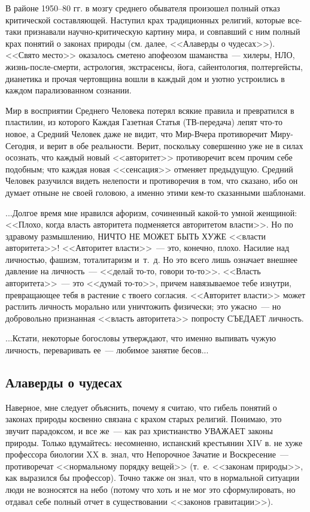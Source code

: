 \documentclass{scrbook}
\newcommand{\flqq}{<<}
\newcommand{\frqq}{>>}
\newcommand{\mdash}{~--- }
\newcommand{\ndash}{--}
\newcommand{\essaysection}[1]{\subsection*{#1}\nopagebreak}
\begin{document}
В районе 1950{\ndash}80 гг. в мозгу среднего обывателя произошел полный отказ критической составляющей. Наступил крах традиционных религий, которые все-таки признавали научно-критическую картину мира, и совпавший с ним полный крах понятий о законах природы (см. далее, {\flqq}Алаверды о чудесах{\frqq}). {\flqq}Свято место{\frqq} оказалось сметено апофеозом шаманства{\mdash}хилеры, НЛО, жизнь-после-смерти, астрология, экстрасенсы, йога, сайентология, полтергейсты, дианетика и прочая чертовщина вошли в каждый дом и уютно устроились в каждом парализованном сознании.

Мир в восприятии Среднего Человека потерял всякие правила и превратился в пластилин, из которого Каждая Газетная Статья (ТВ-передача) лепят что-то новое, а Средний Человек даже не видит, что Мир-Вчера противоречит Миру-Сегодня, и верит в обе реальности. Верит, поскольку совершенно уже не в силах осознать, что каждый новый {\flqq}авторитет{\frqq} противоречит всем прочим себе подобным; что каждая новая {\flqq}сенсация{\frqq} отменяет предыдущую. Средний Человек разучился видеть нелепости и противоречия в том, что сказано, ибо он думает отныне не своей головою, а именно этими кем-то сказанными шаблонами.

...Долгое время мне нравился афоризм, сочиненный какой-то умной женщиной: {\flqq}Плохо, когда власть авторитета подменяется авторитетом власти{\frqq}. Но по здравому размышлению, НИЧТО НЕ МОЖЕТ БЫТЬ ХУЖЕ {\flqq}власти авторитета{\frqq}! {\flqq}Авторитет власти{\frqq}{\mdash}это, конечно, плохо. Насилие над личностью, фашизм, тоталитаризм и~т.~д. Но это всего лишь означает внешнее давление на личность{\mdash}{\flqq}делай то-то, говори то-то{\frqq}. {\flqq}Власть авторитета{\frqq}{\mdash}это {\flqq}думай то-то{\frqq}, причем навязываемое тебе изнутри, превращающее тебя в растение с твоего согласия. {\flqq}Авторитет власти{\frqq} может растлить личность морально или уничтожить физически; это ужасно{\mdash}но добровольно признанная {\flqq}власть авторитета{\frqq} попросту СЪЕДАЕТ личность.

...Кстати, некоторые богословы утверждают, что именно выпивать чужую личность, переваривать ее{\mdash}любимое занятие бесов...

\essaysection{Алаверды о чудесах}

Наверное, мне следует объяснить, почему я считаю, что гибель понятий о законах природы косвенно связана с крахом старых религий. Понимаю, это звучит парадоксом, и все же{\mdash}как раз христианство УВАЖАЕТ законы природы. Только вдумайтесь: несомненно, испанский крестьянин XIV в. не хуже профессора биологии XX в. знал, что Непорочное Зачатие и Воскресение{\mdash}противоречат {\flqq}нормальному порядку вещей{\frqq} (т.~е. {\flqq}законам природы{\frqq}, как выразился бы профессор). Точно также он знал, что в нормальной ситуации люди не возносятся на небо (потому что хоть и не мог это сформулировать, но отдавал себе полный отчет в существовании {\flqq}законов гравитации{\frqq}).
\end{document}

